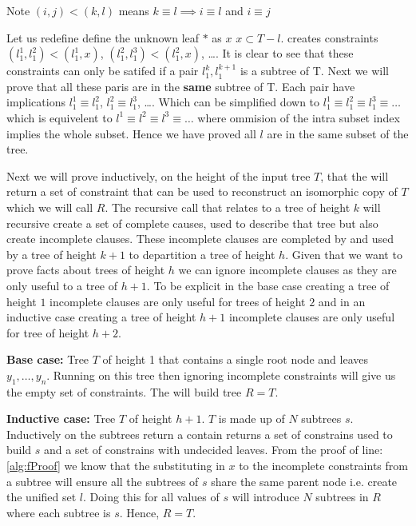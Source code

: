 Note $(i, j) < (k, l)$ means $k \equiv l \implies i \equiv l$ and $i \equiv j$

Let us redefine define the unknown leaf $*$ as $x$  $x\subset T-l$.
 creates constraints $(l_1^1, l_1^2) < (l_1^1, x)$, $(l_1^2, l_1^3) < (l_1^2, x)$, \ldots. It is clear to see that these constraints can only be satifed if a pair $l_1^k, l_1^{k+1}$ is a subtree of T. Next we will prove that all these paris are in the \textbf{same} subtree of T. Each pair have implications $l_1^1 \equiv l_1^2$, $l_1^2 \equiv l_1^3$, \ldots. Which can be simplified down to $l_1^1 \equiv l_1^2 \equiv l_1^3 \equiv \ldots$ which is equivelent to $l^1 \equiv l^2 \equiv l^3 \equiv \ldots$ where ommision of the intra subset index implies the whole subset. Hence we have proved all $l$ are in the same subset of the tree.


Next we will prove inductively, on the height of the input tree $T$, that the  will return a set of constraint that can be used to reconstruct an isomorphic copy of $T$ which we will call $R$. The recursive call that relates to a tree of height $k$ will recursive create a set of complete causes, used to describe that tree but also create incomplete clauses. These incomplete clauses are completed by and used by a tree of height $k+1$ to departition a tree of height $h$. Given that we want to prove facts about trees of height $h$ we can ignore incomplete clauses as they are only useful to a tree of $h+1$. To be explicit in the base case creating a tree of height $1$ incomplete clauses are only useful for trees of height $2$ and in an inductive case creating a tree of height $h+1$ incomplete clauses are only useful for tree of height $h+2$.


\textbf{Base case:} Tree $T$ of height 1 that contains a single root node and leaves $y_1, \ldots, y_n$. Running  on this tree then ignoring incomplete constraints will give us the empty set of constraints. The  will build tree $R=T$. 

\textbf{Inductive case:} Tree $T$ of height $h+1$. $T$ is made up of $N$ subtrees $s$. Inductively  on the subtrees return a contain returns a set of constrains used to build $s$ and a set of constrains with undecided leaves. From the proof of  line:\ref{alg:fProof} we know that the substituting in $x$ to the incomplete constraints from a subtree will ensure all the subtrees of $s$ share the same parent node i.e. create the unified set $l$. Doing this for all values of $s$ will introduce $N$ subtrees in $R$ where each subtree is $s$. Hence, $R=T$.  

